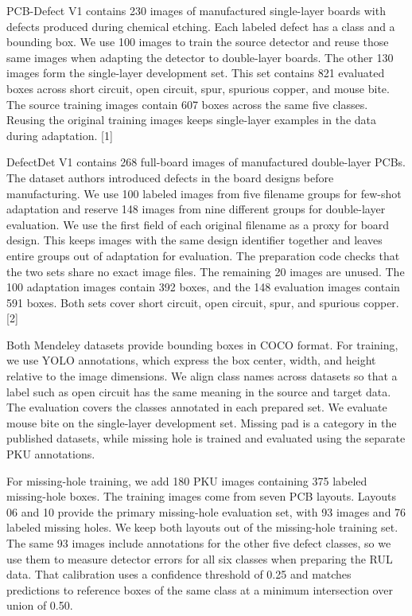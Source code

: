\documentclass[conference]{IEEEtran}
\begin{document}
PCB-Defect V1 contains 230 images of manufactured single-layer boards with defects produced during chemical etching. Each labeled defect has a class and a bounding box. We use 100 images to train the source detector and reuse those same images when adapting the detector to double-layer boards. The other 130 images form the single-layer development set. This set contains 821 evaluated boxes across short circuit, open circuit, spur, spurious copper, and mouse bite. The source training images contain 607 boxes across the same five classes. Reusing the original training images keeps single-layer examples in the data during adaptation. [1]

DefectDet V1 contains 268 full-board images of manufactured double-layer PCBs. The dataset authors introduced defects in the board designs before manufacturing. We use 100 labeled images from five filename groups for few-shot adaptation and reserve 148 images from nine different groups for double-layer evaluation. We use the first field of each original filename as a proxy for board design. This keeps images with the same design identifier together and leaves entire groups out of adaptation for evaluation. The preparation code checks that the two sets share no exact image files. The remaining 20 images are unused. The 100 adaptation images contain 392 boxes, and the 148 evaluation images contain 591 boxes. Both sets cover short circuit, open circuit, spur, and spurious copper. [2]

Both Mendeley datasets provide bounding boxes in COCO format. For training, we use YOLO annotations, which express the box center, width, and height relative to the image dimensions. We align class names across datasets so that a label such as open circuit has the same meaning in the source and target data. The evaluation covers the classes annotated in each prepared set. We evaluate mouse bite on the single-layer development set. Missing pad is a category in the published datasets, while missing hole is trained and evaluated using the separate PKU annotations.

For missing-hole training, we add 180 PKU images containing 375 labeled missing-hole boxes. The training images come from seven PCB layouts. Layouts 06 and 10 provide the primary missing-hole evaluation set, with 93 images and 76 labeled missing holes. We keep both layouts out of the missing-hole training set. The same 93 images include annotations for the other five defect classes, so we use them to measure detector errors for all six classes when preparing the RUL data. That calibration uses a confidence threshold of 0.25 and matches predictions to reference boxes of the same class at a minimum intersection over union of 0.50.
\end{document}
